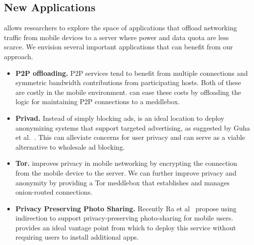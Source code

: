 \subsection{New Applications}
\label{subsec:newapps}

\meddle allows researchers to explore the space of applications that offload 
networking traffic from mobile devices to a server where power and data quota 
are less scarce. We envision several important applications that can benefit 
from our approach.

\begin{itemize}
\item \textbf{P2P offloading.} P2P services tend to benefit from multiple connections 
and symmetric bandwidth contributions from participating hosts. Both of these are 
costly in the mobile environment. \meddle can ease these costs by offloading the 
logic for maintaining P2P connections to a meddlebox.
\item \textbf{Privad.}  Instead of simply blocking ads, \meddle is an ideal location 
to deploy anonymizing systems that support targeted advertising, as suggested by 
Guha et al.~\cite{guha:privad}. This can alleviate concerns for user privacy and can 
serve as a viable alternative to wholesale ad blocking.
\item \textbf{Tor.} \meddle improves privacy in mobile networking by encrypting the 
connection from the mobile device to the \meddle server. We can further improve 
privacy and anonymity by providing a Tor meddlebox that establishes and manages 
onion-routed connections.
\item \textbf{Privacy Preserving Photo Sharing.} Recently Ra et al~\cite{ra:p3} propose 
using indirection to support privacy-preserving photo-sharing for mobile users. \meddle 
provides an ideal vantage point from which to deploy this service without requiring 
users to install additional apps. 

\end{itemize}


